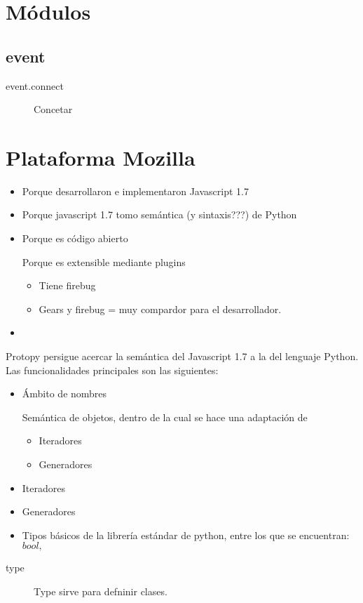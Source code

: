 \documentclass[a4paper]{report}
\begin{document}
\section{Módulos}
\subsection{event}
\begin{description}
\item[event.connect]{Concetar}
\end{description}
\section{Plataforma Mozilla}
\begin{itemize}
  \item Porque desarrollaron e implementaron Javascript 1.7
  \item Porque javascript 1.7 tomo semántica (y sintaxis???) de Python
  \item Porque es código abierto
  \begin{item}
  	Porque es extensible mediante plugins
  	\begin{itemize}
        \item Tiene firebug
        \item Gears y firebug = muy compardor para el desarrollador.
     \end{itemize}
      
  \end{item}
  \item 
\end{itemize}




\label{ch:protopy}

Protopy persigue acercar la semántica del Javascript 1.7 a la del lenguaje
Python. Las funcionalidades principales son las siguientes:
\begin{itemize}
  \item Ámbito de nombres
  \begin{item}
  Semántica de objetos, dentro de la cual se hace una adaptación de
  \begin{itemize}
  	\item Iteradores
  	\item Generadores  
  \end{itemize}
  \end{item}
  
  
  \item Iteradores
  \item Generadores
  
  \item Tipos básicos de la librería estándar de python, entre los que se
  encuentran: $ bool, $
\end{itemize}


\begin{description}
\item[type]{
Type sirve para defninir clases.
}
\end{description}
\begin{thebibliography}{99}


\end{thebibliography}
\end{document}
